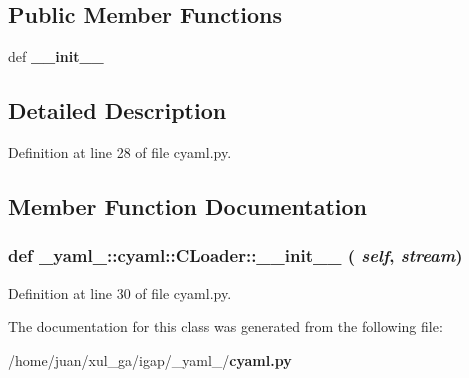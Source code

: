 \subsection*{Public Member Functions}
\begin{CompactItemize}
\item 
def {\bf \_\-\_\-init\_\-\_\-}
\end{CompactItemize}


\subsection{Detailed Description}


Definition at line 28 of file cyaml.py.

\subsection{Member Function Documentation}
\subsubsection{\setlength{\rightskip}{0pt plus 5cm}def \_\-yaml\_\-::cyaml::CLoader::\_\-\_\-init\_\-\_\- ( {\em self},  {\em stream})}\label{class__yaml___1_1cyaml_1_1CLoader_32a4137c75e4c0f9cdfe110723729833}




Definition at line 30 of file cyaml.py.

The documentation for this class was generated from the following file:\begin{CompactItemize}
\item 
/home/juan/xul\_\-ga/igap/\_\-yaml\_\-/{\bf cyaml.py}\end{CompactItemize}
